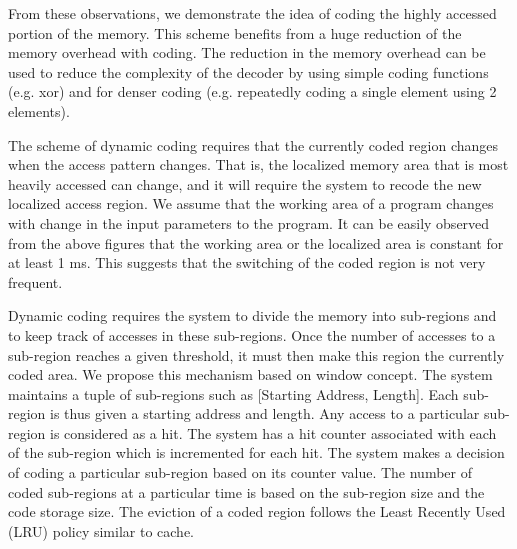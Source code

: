 From these observations, we demonstrate the idea of coding the 
highly accessed portion of the memory. This scheme benefits from a huge 
reduction of the memory overhead with coding. The reduction in the memory 
overhead can be used to reduce the complexity of the decoder by using simple 
coding functions (e.g. xor) and for denser coding (e.g. repeatedly coding a 
single element using 2 elements). 

The scheme of dynamic coding requires that the currently coded region changes 
when the access pattern changes. That is, the localized memory area that is most heavily accessed 
can change, and it will require the system to recode the new localized access 
region. We assume that the working area of a program changes with change in the 
input parameters to the program. It can be easily observed from the above 
figures that the working area or the localized area is constant for at least 1 
ms. This suggests that the switching of the coded region is not very frequent. 

Dynamic coding requires the system to divide the memory into sub-regions and to 
keep track of accesses in these sub-regions. Once the number of accesses to a 
sub-region reaches a given threshold, it must then make this region the 
currently coded area. We propose this mechanism based on window concept. The 
system maintains a tuple of sub-regions such as [Starting Address, Length]. Each 
sub-region is thus given a starting address and length. Any access to a 
particular sub-region is considered as a hit. The system has a hit counter 
associated with each of the sub-region which is incremented for each hit. The 
system makes a decision of coding a particular sub-region based on its counter 
value. The number of coded sub-regions at a particular time is based on the 
sub-region size and the code storage size. The eviction of a coded region 
follows the Least Recently Used (LRU) policy similar to cache. 

